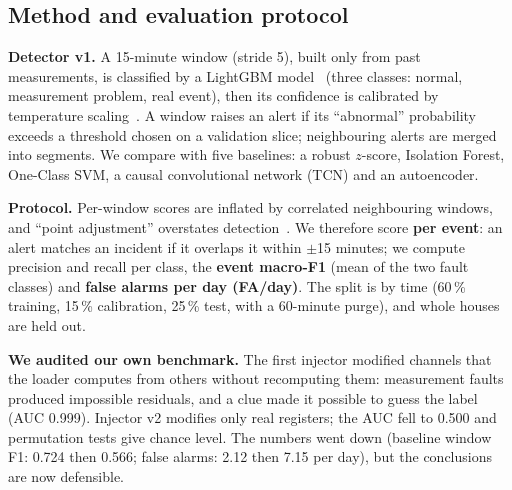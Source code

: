 \subsection{Method and evaluation protocol}
\textbf{Detector v1.} A 15-minute window (stride 5), built only from past measurements, is classified by a LightGBM model~\cite{lightgbm} (three classes: normal, measurement problem, real event), then its confidence is calibrated by temperature scaling~\cite{guo}. A window raises an alert if its ``abnormal'' probability exceeds a threshold chosen on a validation slice; neighbouring alerts are merged into segments. We compare with five baselines: a robust $z$-score, Isolation Forest, One-Class SVM, a causal convolutional network (TCN) and an autoencoder.

\textbf{Protocol.} Per-window scores are inflated by correlated neighbouring windows, and ``point adjustment'' overstates detection~\cite{tatbul}. We therefore score \textbf{per event}: an alert matches an incident if it overlaps it within $\pm$15 minutes; we compute precision and recall per class, the \textbf{event macro-F1} (mean of the two fault classes) and \textbf{false alarms per day (FA/day)}. The split is by time (60\,\% training, 15\,\% calibration, 25\,\% test, with a 60-minute purge), and whole houses are held out.

\textbf{We audited our own benchmark.} The first injector modified channels that the loader computes from others without recomputing them: measurement faults produced impossible residuals, and a clue made it possible to guess the label (AUC 0.999). Injector v2 modifies only real registers; the AUC fell to 0.500 and permutation tests give chance level. The numbers went down (baseline window F1: 0.724 then 0.566; false alarms: 2.12 then 7.15 per day), but the conclusions are now defensible.

